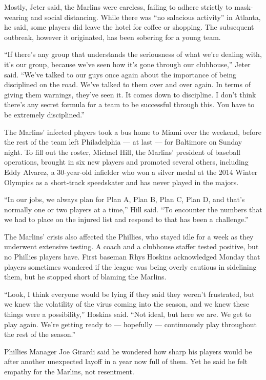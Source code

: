 Mostly, Jeter said, the Marlins were careless, failing to adhere
strictly to mask-wearing and social distancing. While there was ``no
salacious activity'' in Atlanta, he said, some players did leave the
hotel for coffee or shopping. The subsequent outbreak, however it
originated, has been sobering for a young team.

``If there's any group that understands the seriousness of what we're
dealing with, it's our group, because we've seen how it's gone through
our clubhouse,'' Jeter said. ``We've talked to our guys once again about
the importance of being disciplined on the road. We've talked to them
over and over again. In terms of giving them warnings, they've seen it.
It comes down to discipline. I don't think there's any secret formula
for a team to be successful through this. You have to be extremely
disciplined.''

The Marlins' infected players took a bus home to Miami over the weekend,
before the rest of the team left Philadelphia --- at last --- for
Baltimore on Sunday night. To fill out the roster, Michael Hill, the
Marlins' president of baseball operations, brought in six new players
and promoted several others, including Eddy Alvarez, a 30-year-old
infielder who won a silver medal at the 2014 Winter Olympics as a
short-track speedskater and has never played in the majors.

``In our jobs, we always plan for Plan A, Plan B, Plan C, Plan D, and
that's normally one or two players at a time,'' Hill said. ``To
encounter the numbers that we had to place on the injured list and
respond to that has been a challenge.''

The Marlins' crisis also affected the Phillies, who stayed idle for a
week as they underwent extensive testing. A coach and a clubhouse
staffer tested positive, but no Phillies players have. First baseman
Rhys Hoskins acknowledged Monday that players sometimes wondered if the
league was being overly cautious in sidelining them, but he stopped
short of blaming the Marlins.

``Look, I think everyone would be lying if they said they weren't
frustrated, but we knew the volatility of the virus coming into the
season, and we knew these things were a possibility,'' Hoskins said.
``Not ideal, but here we are. We get to play again. We're getting ready
to --- hopefully --- continuously play throughout the rest of the
season.''

Phillies Manager Joe Girardi said he wondered how sharp his players
would be after another unexpected layoff in a year now full of them. Yet
he said he felt empathy for the Marlins, not resentment.

